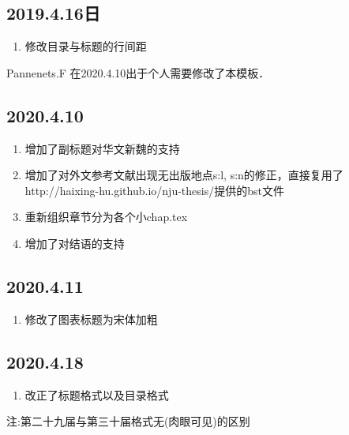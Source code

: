 \subsection{2019.4.16日}
\begin{enumerate}
    \item 修改目录与标题的行间距

\end{enumerate}

Pannenets.F 在2020.4.10出于个人需要修改了本模板．

\subsection{2020.4.10}
\begin{enumerate}
    \item 增加了副标题对华文新魏的支持
    \item 增加了对外文参考文献\cite{ghostnet}出现无出版地点s:l, s:n的修正，直接复用了http://haixing-hu.github.io/nju-thesis/提供的bst文件
    \item 重新组织章节分为各个小chap.tex
    \item 增加了对结语的支持
\end{enumerate}


\subsection{2020.4.11}
\begin{enumerate}
    \item 修改了图表标题为宋体加粗
\end{enumerate}

\subsection{2020.4.18}
\begin{enumerate}
    \item 改正了标题格式以及目录格式
\end{enumerate}


注:第二十九届与第三十届格式无(肉眼可见)的区别


